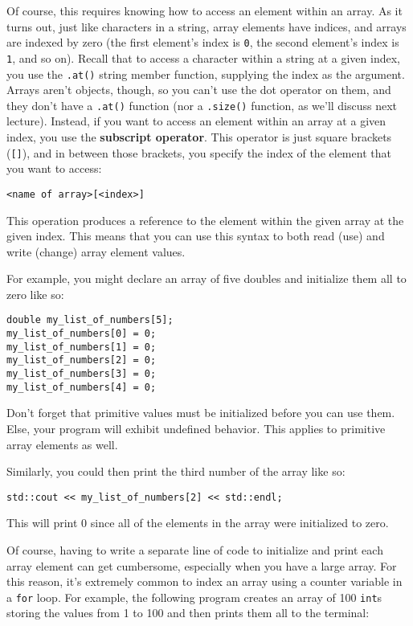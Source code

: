 \documentclass{article}
\newenvironment{tip}
    {\begin{tcolorbox}[title=Tip,colframe=white!70!blue,colback=white]}
    {\end{tcolorbox}}
\begin{document}
Of course, this requires knowing how to access an element within an array. As it turns out, just like characters in a string, array elements have indices, and arrays are indexed by zero (the first element's index is \texttt{0}, the second element's index is \texttt{1}, and so on). Recall that to access a character within a string at a given index, you use the \texttt{.at()} string member function, supplying the index as the argument. Arrays aren't objects, though, so you can't use the dot operator on them, and they don't have a \texttt{.at()} function (nor a \texttt{.size()} function, as we'll discuss next lecture). Instead, if you want to access an element within an array at a given index, you use the \textbf{subscript operator}. This operator is just square brackets (\texttt{[]}), and in between those brackets, you specify the index of the element that you want to access:

\begin{verbatim}
<name of array>[<index>]
\end{verbatim}

This operation produces a reference to the element within the given array at the given index. This means that you can use this syntax to both read (use) and write (change) array element values.

For example, you might declare an array of five doubles and initialize them all to zero like so:

\begin{verbatim}
double my_list_of_numbers[5];
my_list_of_numbers[0] = 0;
my_list_of_numbers[1] = 0;
my_list_of_numbers[2] = 0;
my_list_of_numbers[3] = 0;
my_list_of_numbers[4] = 0;
\end{verbatim}

\begin{tip}
    Don't forget that primitive values must be initialized before you can use them. Else, your program will exhibit undefined behavior. This applies to primitive array elements as well.
\end{tip}

Similarly, you could then print the third number of the array like so:

\begin{verbatim}
std::cout << my_list_of_numbers[2] << std::endl;
\end{verbatim}

This will print 0 since all of the elements in the array were initialized to zero.

Of course, having to write a separate line of code to initialize and print each array element can get cumbersome, especially when you have a large array. For this reason, it's extremely common to index an array using a counter variable in a \texttt{for} loop. For example, the following program creates an array of 100 \texttt{int}s storing the values from 1 to 100 and then prints them all to the terminal:
\end{document}
